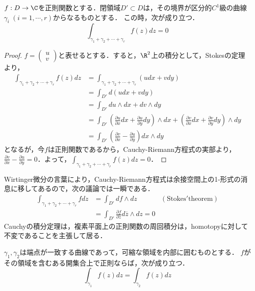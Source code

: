 \documentclass[uplatex, dvipdfmx]{jsreport}
\begin{document}
\begin{theorem}
    $f:D\to\C$を正則関数とする．閉領域$D'\subset D$は，その境界が区分的$C^1$級の曲線$\gamma_i\;(i=1,\cdots,r)$からなるものとする．
    この時，次が成り立つ．
    \[ \int_{\gamma_1+\gamma_2+\cdots+\gamma_r}f(z)dz=0 \]
\end{theorem}
\begin{proof}
    $f=\begin{pmatrix}u\\v\end{pmatrix}$と表せるとする．すると，$\R^2$上の積分として，Stokesの定理より，
    \begin{align*}
        \int_{\gamma_1+\gamma_2+\cdots+\gamma_r}f(z)dz &= \int_{\gamma_1+\gamma_2+\cdots+\gamma_r}(udx+vdy)\\
        &= \int_{D'}d(udx+vdy)\\
        &= \int_{D'}du\wedge dx+dv\wedge dy\\
        &= \int_{D'}\left(\frac{\partial u}{\partial x}dx+\frac{\partial u}{\partial y}dy\right)\wedge dx+\left(\frac{\partial v}{\partial x}dx+\frac{\partial v}{\partial y}dy\right)\wedge dy\\
        &= \int_{D'}\left(\frac{\partial v}{\partial x}-\frac{\partial u}{\partial y}\right)dx\wedge dy
    \end{align*}
    となるが，今$f$は正則関数であるから，Cauchy-Riemann方程式の実部より，$\frac{\partial v}{\partial x}-\frac{\partial u}{\partial y}=0$．よって，$\int_{\gamma_1+\gamma_2+\cdots+\gamma_r}f(z)dz=0$．
\end{proof}
\begin{remark}[一般の境界付き多様体上のStokesの定理からは例として一瞬で示せる]
    Wirtinger微分の言葉により，Cauchy-Riemann方程式は余接空間上の1-形式の消息に移してあるので，次の議論では一瞬である．
    \begin{align*}
        \int_{\gamma_1+\gamma_2+\cdots+\gamma_r}fdz&=\int_{D'}df\wedge dz&\mathrm{(Stokes' theorem)}\\
        &= \int_{D'}\frac{\partial f}{\partial\overline{z}}d\overline{z}\wedge dz =0
    \end{align*}
    Cauchyの積分定理は，複素平面上の正則関数の周回積分は，homotopyに対して不変であることを主張して居る．
\end{remark}

\begin{corollary}
    $\gamma_1,\gamma_2$は端点が一致する曲線であって，可縮な領域を内部に囲むものとする．
    $f$がその領域を含むある開集合上で正則ならば，次が成り立つ．
    \[\int_{\gamma_1}f(z)dz=\int_{\gamma_2}f(z)dz\]
\end{corollary}
\end{document}
